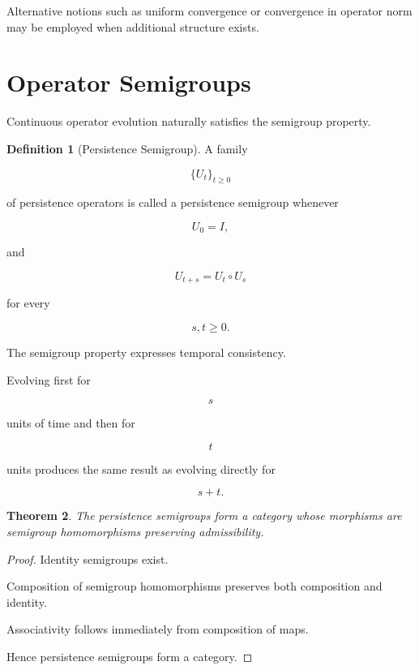 \documentclass[11pt]{book}
\numberwithin{equation}{chapter}
\theoremstyle{definition}
\newtheorem{definition}{Definition}[chapter]
\theoremstyle{plain}
\newtheorem{theorem}[definition]{Theorem}
\begin{document}
Alternative notions such as uniform convergence or convergence in
operator norm may be employed when additional structure exists.

\section{Operator Semigroups}

Continuous operator evolution naturally satisfies the semigroup
property.

\begin{definition}[Persistence Semigroup]

A family

\[
\{
U_t
\}_{t\ge0}
\]

of persistence operators is called a persistence semigroup whenever

\[
U_0
=
I,
\]

and

\[
U_{t+s}
=
U_t
\circ
U_s
\]

for every

\[
s,t\ge0.
\]

\end{definition}

The semigroup property expresses temporal consistency.

Evolving first for

\[
s
\]

units of time and then for

\[
t
\]

units produces the same result as evolving directly for

\[
s+t.
\]

\begin{theorem}

The persistence semigroups form a category whose morphisms are
semigroup homomorphisms preserving admissibility.

\end{theorem}

\begin{proof}

Identity semigroups exist.

Composition of semigroup homomorphisms preserves both composition and
identity.

Associativity follows immediately from composition of maps.

Hence persistence semigroups form a category.

\end{proof}
\end{document}
